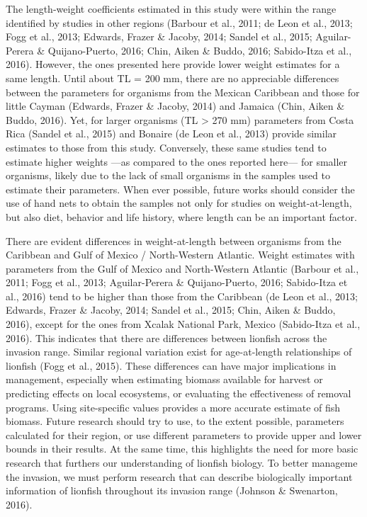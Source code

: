\documentclass[12pt,]{article}
\begin{document}
The length-weight coefficients estimated in this study were within the
range identified by studies in other regions (Barbour et al., 2011; de
Leon et al., 2013; Fogg et al., 2013; Edwards, Frazer \& Jacoby, 2014;
Sandel et al., 2015; Aguilar-Perera \& Quijano-Puerto, 2016; Chin, Aiken
\& Buddo, 2016; Sabido-Itza et al., 2016). However, the ones presented
here provide lower weight estimates for a same length. Until about TL =
200 mm, there are no appreciable differences between the parameters for
organisms from the Mexican Caribbean and those for little Cayman
(Edwards, Frazer \& Jacoby, 2014) and Jamaica (Chin, Aiken \& Buddo,
2016). Yet, for larger organisms (TL \textgreater{} 270 mm) parameters
from Costa Rica (Sandel et al., 2015) and Bonaire (de Leon et al., 2013)
provide similar estimates to those from this study. Conversely, these
same studies tend to estimate higher weights ---as compared to the ones
reported here--- for smaller organisms, likely due to the lack of small
organisms in the samples used to estimate their parameters. When ever
possible, future works should consider the use of hand nets to obtain
the samples not only for studies on weight-at-length, but also diet,
behavior and life history, where length can be an important factor.

There are evident differences in weight-at-length between organisms from
the Caribbean and Gulf of Mexico / North-Western Atlantic. Weight
estimates with parameters from the Gulf of Mexico and North-Western
Atlantic (Barbour et al., 2011; Fogg et al., 2013; Aguilar-Perera \&
Quijano-Puerto, 2016; Sabido-Itza et al., 2016) tend to be higher than
those from the Caribbean (de Leon et al., 2013; Edwards, Frazer \&
Jacoby, 2014; Sandel et al., 2015; Chin, Aiken \& Buddo, 2016), except
for the ones from Xcalak National Park, Mexico (Sabido-Itza et al.,
2016). This indicates that there are differences between lionfish across
the invasion range. Similar regional variation exist for age-at-length
relationships of lionfish (Fogg et al., 2015). These differences can
have major implications in management, especially when estimating
biomass available for harvest or predicting effects on local ecosystems,
or evaluating the effectiveness of removal programs. Using site-specific
values provides a more accurate estimate of fish biomass. Future
research should try to use, to the extent possible, parameters
calculated for their region, or use different parameters to provide
upper and lower bounds in their results. At the same time, this
highlights the need for more basic research that furthers our
understanding of lionfish biology. To better manageme the invasion, we
must perform research that can describe biologically important
information of lionfish throughout its invasion range (Johnson \&
Swenarton, 2016).
\end{document}
